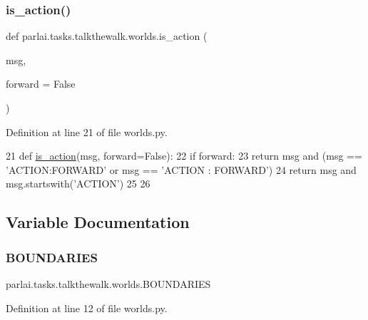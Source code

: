 \subsubsection{\texorpdfstring{is\+\_\+action()}{is\_action()}}
{\footnotesize\ttfamily def parlai.\+tasks.\+talkthewalk.\+worlds.\+is\+\_\+action (\begin{DoxyParamCaption}\item[{}]{msg,  }\item[{}]{forward = {\ttfamily False} }\end{DoxyParamCaption})}



Definition at line 21 of file worlds.\+py.


\begin{DoxyCode}
21 \textcolor{keyword}{def }\hyperlink{namespaceparlai_1_1tasks_1_1talkthewalk_1_1worlds_aa28536df060005c301225d766f91cb13}{is\_action}(msg, forward=False):
22     \textcolor{keywordflow}{if} forward:
23         \textcolor{keywordflow}{return} msg \textcolor{keywordflow}{and} (msg == \textcolor{stringliteral}{'ACTION:FORWARD'} \textcolor{keywordflow}{or} msg == \textcolor{stringliteral}{'ACTION : FORWARD'})
24     \textcolor{keywordflow}{return} msg \textcolor{keywordflow}{and} msg.startswith(\textcolor{stringliteral}{'ACTION'})
25 
26 
\end{DoxyCode}


\subsection{Variable Documentation}
\mbox{\label{namespaceparlai_1_1tasks_1_1talkthewalk_1_1worlds_a8226866b052384337daa2a4b64460221}} 
\subsubsection{\texorpdfstring{B\+O\+U\+N\+D\+A\+R\+I\+ES}{BOUNDARIES}}
{\footnotesize\ttfamily parlai.\+tasks.\+talkthewalk.\+worlds.\+B\+O\+U\+N\+D\+A\+R\+I\+ES}



Definition at line 12 of file worlds.\+py.

